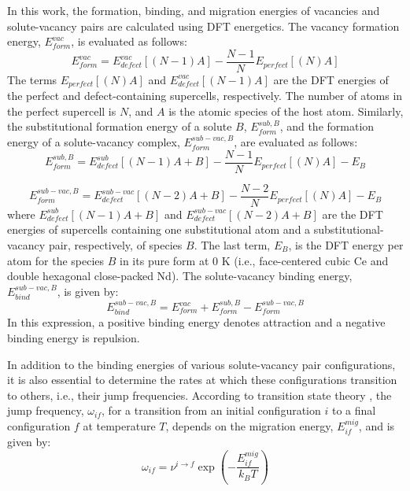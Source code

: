\documentclass[preprint,12pt]{elsarticle}
\begin{document}
In this work, the formation, binding, and migration energies of vacancies and solute-vacancy pairs are calculated using DFT energetics. The vacancy formation energy, $E_{form}^{vac}$, is evaluated as follows:
\begin{equation}
\label{eq_Ef_vac}
   E_{form}^{vac} = E^{vac}_{defect}[(N-1)A] - \frac{N-1}{N} E_{perfect}[(N) A] 
\end{equation}
The terms $E_{perfect}[(N) A]$ and $E^{vac}_{defect}[(N-1)A]$ are the DFT energies of the perfect and defect-containing supercells, respectively. The number of atoms in the perfect supercell is $N$, and $A$ is the atomic species of the host atom. Similarly, the substitutional formation energy of a solute $B$, $E_{form}^{sub,B}$, and the formation energy of a solute-vacancy complex, $E_{form}^{sub-vac,B}$, are evaluated as follows:
\begin{equation}
\label{eq_Ef_sub}
    E_{form}^{sub,B} = E_{defect}^{sub}[(N-1)A + B] - \frac{N-1}{N}E_{perfect}[(N) A] - E_{B}
\end{equation}

\begin{equation}
\label{eq_Ef_vac_sub}
    E_{form}^{sub-vac,B} = E_{defect}^{sub-vac}[(N-2)A + B] - \frac{N-2}{N}E_{perfect}[(N) A] - E_{B}
\end{equation}
where $E_{defect}^{sub}[(N-1)A + B]$ and $E_{defect}^{sub-vac}[(N-2)A + B]$ are the DFT energies of supercells containing one substitutional atom and a substitutional-vacancy pair, respectively, of species $B$. The last term, $E_{B}$, is the DFT energy per atom for the species $B$ in its pure form at 0 K (i.e., face-centered cubic Ce and double hexagonal close-packed Nd). The solute-vacancy binding energy, $E_{bind}^{sub-vac,B}$, is given by:
\begin{equation}
\label{eq_Eb}
    E_{bind}^{sub-vac,B} = E_{form}^{vac} + E_{form}^{sub,B} - E_{form}^{sub-vac,B}
\end{equation}
In this expression, a positive binding energy denotes attraction and a negative binding energy is repulsion. 

In addition to the binding energies of various solute-vacancy pair configurations, it is also essential to determine the rates at which these configurations transition to others, i.e., their jump frequencies. According to transition state theory \cite{vineyard_frequency_1957}, the jump frequency, $\omega_{if}$, for a transition from an initial configuration $i$ to a final configuration $f$ at temperature $T$, depends on the migration energy, $E_{if}^{mig}$, and is given by:
\begin{equation}
\omega_{if} = \nu^{i\rightarrow f} \exp\left(-\frac{E_{if}^{mig}}{k_BT}\right)
\end{equation}
\end{document}
